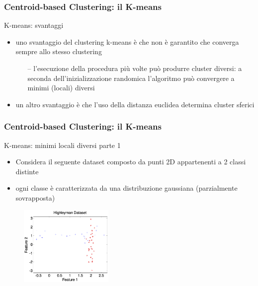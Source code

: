 \begin{frame}

	\frametitle{{\color{GradientDescentDiagramBlue}Centroid-based Clustering}: il K-means}

	\begin{block}{K-means: svantaggi}
		\begin{itemize}
			\item uno svantaggio del clustering k-means è che non è garantito che converga sempre allo stesso clustering
				\begin{itemize}
					\item[--] l'esecuzione della procedura più volte può produrre cluster diversi: a seconda dell'inizializzazione randomica l'algoritmo può convergere a minimi (locali) diversi
				\end{itemize}
			\item un altro svantaggio è che l'uso della distanza euclidea determina cluster sferici
		\end{itemize}
	\end{block}

\end{frame}


\begin{frame}

	\frametitle{{\color{GradientDescentDiagramBlue}Centroid-based Clustering}: il K-means}

	\begin{block}{K-means: minimi locali diversi parte 1}
		\begin{itemize}
			\item Considera il seguente dataset composto da punti 2D appartenenti a 2 classi distinte
			\item ogni classe è caratterizzata da una distribuzione gaussiana (parzialmente sovrapposta)
		\end{itemize}

		\begin{figure}[!htbp]
			\centering
			\includegraphics[width=4.50cm]{images/unsupervised/kmeans/highley_gt.png}
		\end{figure}
	\end{block}

\end{frame}


